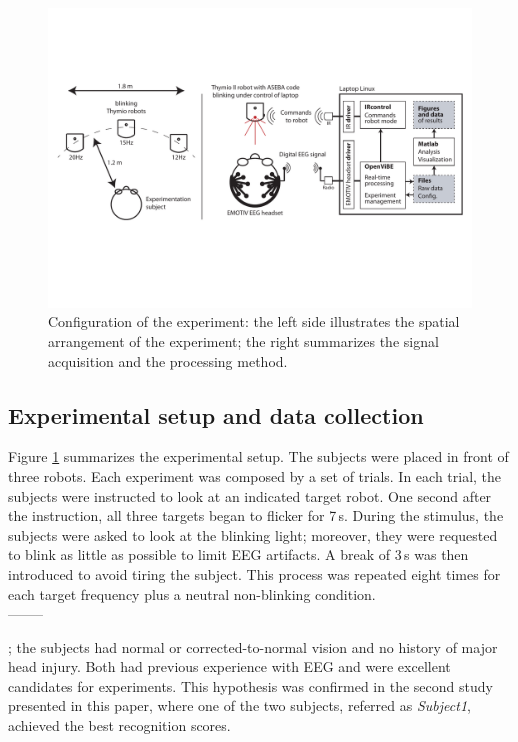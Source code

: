 \documentclass[smallextended]{svjour3}
\begin{document}
\begin{figure} \center
\includegraphics[width=\textwidth]{figures/schema-global.pdf}
\caption{Configuration of the experiment: the left side illustrates the spatial arrangement of the experiment; the right summarizes the signal acquisition and the processing method.} \label{fig:thymioinstall}
\end{figure}

\subsection{Experimental setup and data collection}
Figure \ref{fig:thymioinstall} summarizes the experimental setup. 
The subjects were placed in front of three robots. 
Each experiment was composed by a set of trials. In each trial, the subjects were instructed to look at an indicated target robot. 
One second after the instruction, all three targets began to flicker for 7\,s. During the stimulus, the subjects were asked to look at the blinking light; moreover, they were requested to blink as little as possible to limit EEG artifacts. 
A break of 3\,s was then introduced to avoid tiring the subject. 
This process was repeated eight times for each target frequency plus a neutral non-blinking condition. \\
\iffalse
--------

; the subjects had normal or corrected-to-normal vision and no history of major head injury. 
Both had previous experience with EEG and were excellent candidates for experiments. 
This hypothesis was confirmed in the second study presented in this paper, where one of the two subjects, referred as \textit{Subject1}, achieved the best recognition scores. \\
\\
\end{document}

